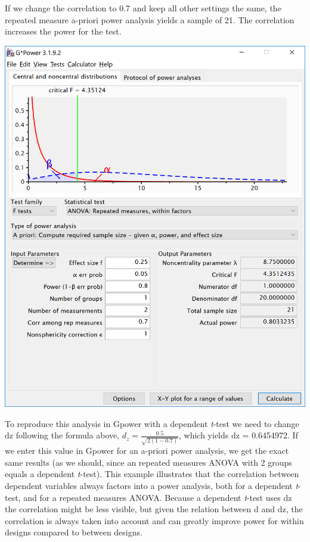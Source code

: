 \documentclass[]{book}
\begin{document}
If we change the correlation to 0.7 and keep all other settings the same, the repeated measure a-priori power analysis yields a sample of 21. The correlation increases the power for the test.

\includegraphics{screenshots/gpower_11.png}

To reproduce this analysis in Gpower with a dependent \emph{t}-test we need to change dz following the formula above, \(d_{z}=\frac{0.5}{\sqrt{2(1-0.7)}}\), which yields dz = 0.6454972. If we enter this value in Gpower for an a-priori power analysis, we get the exact same results (as we should, since an repeated measures ANOVA with 2 groups equals a dependent \emph{t}-test). This example illustrates that the correlation between dependent variables always factors into a power analysis, both for a dependent \emph{t}-test, and for a repeated measures ANOVA. Because a dependent \emph{t}-test uses dz the correlation might be less visible, but given the relation between d and dz, the correlation is always taken into account and can greatly improve power for within designs compared to between designs.
\end{document}
